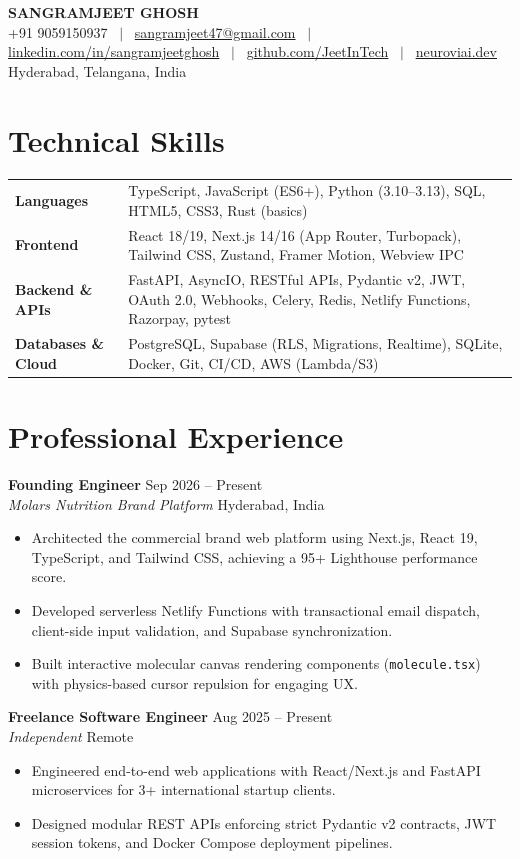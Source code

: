 \documentclass[10pt]{article}
\makeatletter
\newcommand{\resumeHeader}{
\begin{center}
{\LARGE \textbf{SANGRAMJEET GHOSH}} \\[3pt]
{\small
+91 9059150937 ~$|$~
\href{mailto:sangramjeet47@gmail.com}{sangramjeet47@gmail.com} ~$|$~
\href{https://www.linkedin.com/in/sangramjeetghosh}{linkedin.com/in/sangramjeetghosh} ~$|$~
\href{https://github.com/JeetInTech}{github.com/JeetInTech} ~$|$~
\href{https://neuroviai.dev}{neuroviai.dev}
}\\[1pt]
{\footnotesize Hyderabad, Telangana, India}
\end{center}
\vspace{-8pt}
}
\makeatother
\begin{document}
\resumeHeader

\section*{Technical Skills}
\begin{tabularx}{\textwidth}{@{}l X@{}}
\textbf{Languages} & TypeScript, JavaScript (ES6+), Python (3.10--3.13), SQL, HTML5, CSS3, Rust (basics) \\[1.5pt]
\textbf{Frontend} & React 18/19, Next.js 14/16 (App Router, Turbopack), Tailwind CSS, Zustand, Framer Motion, Webview IPC \\[1.5pt]
\textbf{Backend \& APIs} & FastAPI, AsyncIO, RESTful APIs, Pydantic v2, JWT, OAuth 2.0, Webhooks, Celery, Redis, Netlify Functions, Razorpay, pytest \\[1.5pt]
\textbf{Databases \& Cloud} & PostgreSQL, Supabase (RLS, Migrations, Realtime), SQLite, Docker, Git, CI/CD, AWS (Lambda/S3) \\
\end{tabularx}

\section*{Professional Experience}
\textbf{Founding Engineer} \hfill Sep 2026 -- Present \\
\textit{Molars Nutrition Brand Platform} \hfill Hyderabad, India
\begin{itemize}
    \item Architected the commercial brand web platform using Next.js, React 19, TypeScript, and Tailwind CSS, achieving a 95+ Lighthouse performance score.
    \item Developed serverless Netlify Functions with transactional email dispatch, client-side input validation, and Supabase synchronization.
    \item Built interactive molecular canvas rendering components (\texttt{molecule.tsx}) with physics-based cursor repulsion for engaging UX.
\end{itemize}

\vspace{1.5pt}
\textbf{Freelance Software Engineer} \hfill Aug 2025 -- Present \\
\textit{Independent} \hfill Remote
\begin{itemize}
    \item Engineered end-to-end web applications with React/Next.js and FastAPI microservices for 3+ international startup clients.
    \item Designed modular REST APIs enforcing strict Pydantic v2 contracts, JWT session tokens, and Docker Compose deployment pipelines.
\end{itemize}
\end{document}
